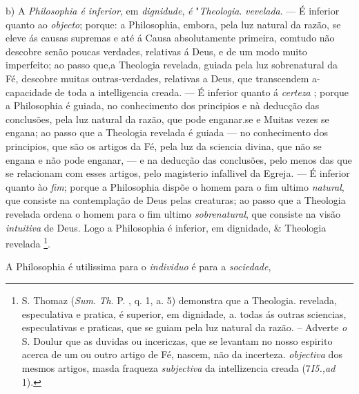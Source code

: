 b) A \emph{Philosophia é inferior}, em \emph{dignidude}, \emph{é} "\emph{Theologia}. \emph{vevelada}. --- É inferior quanto ao \emph{objecto}; porque: a Philosophia, embora, pela luz natural da razão, se eleve ás causas supremas e até á Causa absolutamente primeira, comtudo não descobre senão poucas verdades, relativas á Deus, e de um modo muito imperfeito; ao passo que,a Theologia revelada, guiada pela luz sobrenatural da Fé, descobre muitas outras-verdades, relativas a Deus, que transcendem a- capacidade de toda a intelligencia creada. --- É inferior quanto á \emph{certeza} ; porque a Philosophia é guiada, no conhecimento dos principios e nà deducção das conclusões, pela luz natural da razão, que pode enganar.se e Muitas vezes se engana; ao passo que a Theologia revelada é guiada --- no conhecimento dos principios, que são os artigos da Fé, pela luz da sciencia divina, que não se engana e não pode enganar, --- e na deducção das conclusões, pelo menos das que se relacionam com esses artigos, pelo magisterio infallivel da Egreja. --- É inferior quanto ào \emph{fim}; porque a Philosophia dispõe o homem para o fim ultimo \emph{natural}, que consiste na contemplação de Deus pelas creaturas; ao passo que a Theologia revelada ordena o homem para o fim ultimo \emph{sobrenatural}, que consiste na visão \emph{intuitiva} de Deus. Logo a Philosophia é inferior, em dignidade, \& Theologia revelada \footnote{S. Thomaz (\emph{Sum}. \emph{Th}. P. \textbar{}, q. 1, a. 5) demonstra que a Theologia. revelada, especulativa e pratica, é superior, em dignidade, a. todas ás outras sciencias, especulativas e praticas, que se guiam pela luz natural da razão. -- Adverte \emph{o} S. Doulur que as duvidas ou incericzas, que se levantam no nosso espirito acerca de um ou outro artigo de Fé, nascem, não da incerteza. \emph{objectiva} dos mesmos artigos, masda fraqueza \emph{subjectiva} da intellizencia creada (7\emph{I5.,ad} 1).}.


 
A Philosophia é utilissima para o \emph{individuo} é para a \emph{sociedade},

